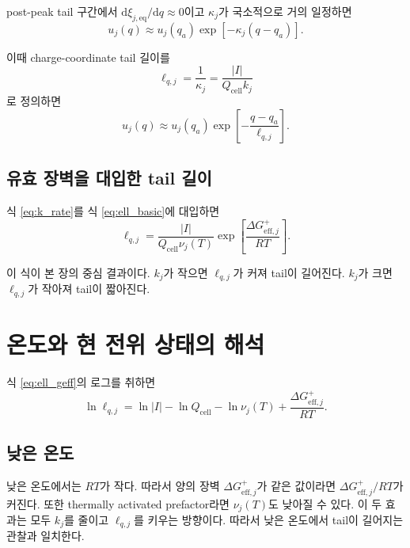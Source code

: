 \documentclass[11pt]{article}
\newcommand{\dd}{\mathrm{d}}
\newcommand{\cell}{\mathrm{cell}}
\newcommand{\eff}{\mathrm{eff}}
\begin{document}
post-peak tail 구간에서 \(\dd \xi_{j,\mathrm{eq}}/\dd q\approx0\)이고 \(\kappa_j\)가 국소적으로 거의 일정하면
\begin{equation}
u_j(q)
\approx
u_j(q_a)
\exp[-\kappa_j(q-q_a)] .
\end{equation}

이때 charge-coordinate tail 길이를
\begin{equation}
\boxed{
\ell_{q,j}
=
\frac{1}{\kappa_j}
=
\frac{|I|}{Q_{\cell}k_j}
}
\label{eq:ell_basic}
\end{equation}
로 정의하면
\begin{equation}
\boxed{
u_j(q)
\approx
u_j(q_a)
\exp\!\left[-\frac{q-q_a}{\ell_{q,j}}\right].
}
\label{eq:u_tail}
\end{equation}

\subsection{유효 장벽을 대입한 tail 길이}

식 \eqref{eq:k_rate}를 식 \eqref{eq:ell_basic}에 대입하면
\begin{equation}
\boxed{
\ell_{q,j}
=
\frac{|I|}{Q_{\cell}\nu_j(T)}
\exp\!\left[
\frac{\Delta G_{\eff,j}^{+}}{RT}
\right].
}
\label{eq:ell_geff}
\end{equation}

이 식이 본 장의 중심 결과이다. \(k_j\)가 작으면 \(\ell_{q,j}\)가 커져 tail이 길어진다. \(k_j\)가 크면 \(\ell_{q,j}\)가 작아져 tail이 짧아진다.

\section{온도와 현 전위 상태의 해석}

식 \eqref{eq:ell_geff}의 로그를 취하면
\begin{equation}
\ln \ell_{q,j}
=
\ln |I|
-\ln Q_{\cell}
-\ln \nu_j(T)
+
\frac{\Delta G_{\eff,j}^{+}}{RT}.
\label{eq:ln_ell}
\end{equation}

\subsection{낮은 온도}

낮은 온도에서는 \(RT\)가 작다. 따라서 양의 장벽 \(\Delta G_{\eff,j}^{+}\)가 같은 값이라면 \(\Delta G_{\eff,j}^{+}/RT\)가 커진다. 또한 thermally activated prefactor라면 \(\nu_j(T)\)도 낮아질 수 있다. 이 두 효과는 모두 \(k_j\)를 줄이고 \(\ell_{q,j}\)를 키우는 방향이다. 따라서 낮은 온도에서 tail이 길어지는 관찰과 일치한다.
\end{document}
